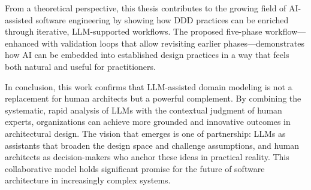 From a theoretical perspective, this thesis contributes to the growing field of AI-assisted software engineering by showing how DDD practices can be enriched through iterative, LLM-supported workflows. The proposed five-phase workflow—enhanced with validation loops that allow revisiting earlier phases—demonstrates how AI can be embedded into established design practices in a way that feels both natural and useful for practitioners.

In conclusion, this work confirms that LLM-assisted domain modeling is not a replacement for human architects but a powerful complement. By combining the systematic, rapid analysis of LLMs with the contextual judgment of human experts, organizations can achieve more grounded and innovative outcomes in architectural design. The vision that emerges is one of partnership: LLMs as assistants that broaden the design space and challenge assumptions, and human architects as decision-makers who anchor these ideas in practical reality. This collaborative model holds significant promise for the future of software architecture in increasingly complex systems.
